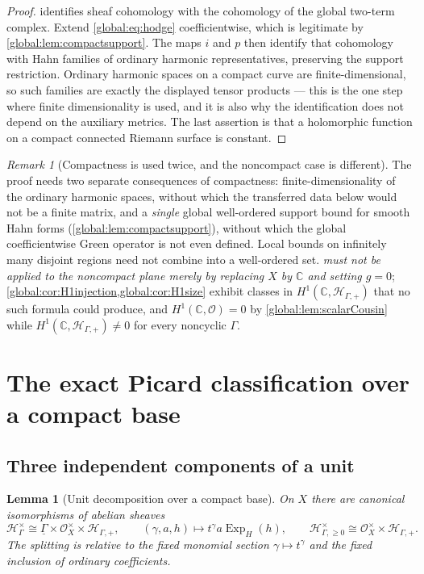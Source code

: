 \documentclass[11pt,letterpaper]{article}
\newtheorem{lemma}[lemma]{Lemma}
\theoremstyle{definition}
\theoremstyle{remark}
\newtheorem{remark}[remark]{Remark}
\newcommand{\C}{\mathbb C}
\newcommand{\OO}{\mathcal O}
\newcommand{\HH}{\mathscr H_\Gamma}
\newcommand{\HP}{\mathscr H_{\Gamma,+}}
\newcommand{\HI}{\mathscr H_{\Gamma,\ge0}}
\newcommand{\ExpH}{\operatorname{Exp}_{H}}
\numberwithin{equation}{section}
\begin{document}
\begin{proof}
 identifies sheaf cohomology with the cohomology of the global two-term complex. Extend \eqref{global:eq:hodge} coefficientwise, which is legitimate by \cref{global:lem:compactsupport}. The maps $i$ and $p$ then identify that cohomology with Hahn families of ordinary harmonic representatives, preserving the support restriction. Ordinary harmonic spaces on a compact curve are finite-dimensional, so such families are exactly the displayed tensor products --- this is the one step where finite dimensionality is used, and it is also why the identification does not depend on the auxiliary metrics. The last assertion is that a holomorphic function on a compact connected Riemann surface is constant.
\end{proof}

\begin{remark}[Compactness is used twice, and the noncompact case is different]\label{global:rem:whycompact}
The proof needs two separate consequences of compactness: finite-dimensionality of the ordinary harmonic spaces, without which the transferred data below would not be a finite matrix, and a \emph{single} global well-ordered support bound for smooth Hahn forms (\cref{global:lem:compactsupport}), without which the global coefficientwise Green operator is not even defined. Local bounds on infinitely many disjoint regions need not combine into a well-ordered set. \emph{ must not be applied to the noncompact plane merely by replacing $X$ by $\C$ and setting $g=0$}; \cref{global:cor:H1injection,global:cor:H1size} exhibit classes in $H^1(\C,\HP)$ that no such formula could produce, and $H^1(\C,\OO)=0$ by \cref{global:lem:scalarCousin} while $H^1(\C,\HP)\ne0$ for every noncyclic $\Gamma$.
\end{remark}

\section{The exact Picard classification over a compact base}\label{global:sec:compactpic}

\subsection{Three independent components of a unit}

\begin{lemma}[Unit decomposition over a compact base]\label{global:lem:unitsX}
On $X$ there are canonical isomorphisms of abelian sheaves
\begin{equation}\label{global:eq:unitsX}
  \HH^\times\cong\underline\Gamma\times\OO_X^\times\times\HP,
  \qquad(\gamma,a,h)\longmapsto t^\gamma a\ExpH(h),
  \qquad
  \HI^\times\cong\OO_X^\times\times\HP .
\end{equation}
The splitting is relative to the fixed monomial section $\gamma\mapsto t^\gamma$ and the fixed inclusion of ordinary coefficients.
\end{lemma}
\end{document}
